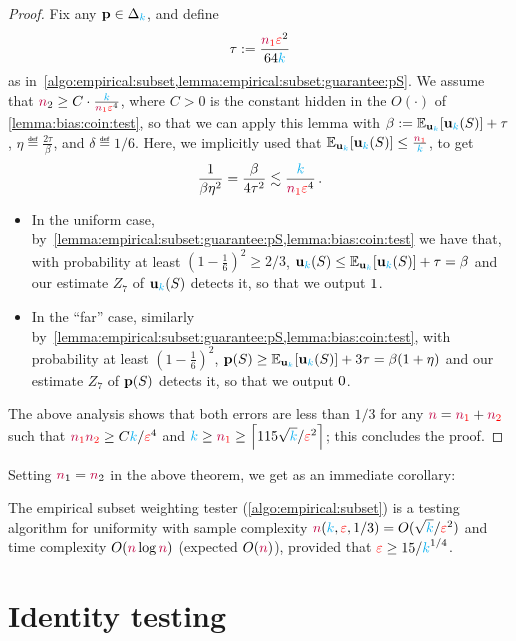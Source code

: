 \begin{proof}
Fix any $\mathbf{p}\in\Delta_{{\textcolor{cyan}{k}}}$, and define 
\[
    \tau := \frac{\textcolor{red}{{\textcolor{purple}{n}}_1}\textcolor{red}{\varepsilon}^2}{64{\textcolor{cyan}{k}}}
\]
as in~\cref{algo:empirical:subset,lemma:empirical:subset:guarantee:pS}. We assume that ${\textcolor{purple}{n}}_2 \geq C\cdot\frac{{\textcolor{cyan}{k}}}{\textcolor{red}{{\textcolor{purple}{n}}_1}\textcolor{red}{\varepsilon}^4}$, where $C>0$ is the constant hidden in the $O(\cdot)$ of \cref{lemma:bias:coin:test}, so that we can apply this lemma with $\beta \eqdef \bE{\uniform_\ab}{\uniform_\ab(S)} + \tau$, $\eta\eqdef \frac{2\tau}{\beta}$, and $\delta \eqdef 1/6$. Here, we implicitly used that
$
 \bE{\uniform_\ab}{\uniform_\ab(S)} \leq \frac{\nss}{\ab}
$,
to get
\[
    \frac{1}{\beta\eta^2} = \frac{\beta}{4\tau^2} \lesssim \frac{{\textcolor{cyan}{k}}}{\textcolor{red}{{\textcolor{purple}{n}}_1}\textcolor{red}{\varepsilon}^4}\,.
\]
\begin{itemize}
    \item In the uniform case, by~\cref{lemma:empirical:subset:guarantee:pS,lemma:bias:coin:test} we have that, with probability at least $(1-\frac{1}{6})^2 \geq 2/3$,
    $\uniform_\ab(S) \leq \bE{\uniform_\ab}{\uniform_\ab(S)} + \tau = \beta$ and our estimate $Z_7$ of  $\mathbf{u}_{\textcolor{cyan}{k}}(S)$ detects it, so that we output $1$. 
    \item In the ``far'' case, similarly by~\cref{lemma:empirical:subset:guarantee:pS,lemma:bias:coin:test}, with probability at least $(1-\frac{1}{6})^2$,
    $\p(S) \geq \bE{\uniform_\ab}{\uniform_\ab(S)} + 3\tau = \beta(1+\eta)$ and our estimate $Z_7$ of  $\mathbf{p}(S)$ detects it, so that we output $0$. 
\end{itemize}
  The above analysis shows that both errors are less than $1/3$ for any ${\textcolor{purple}{n}} = \textcolor{red}{{\textcolor{purple}{n}}_1}+\textcolor{red}{{\textcolor{purple}{n}}_2}$ such that $\textcolor{red}{{\textcolor{purple}{n}}_1}\textcolor{red}{{\textcolor{purple}{n}}_2} \geq C{\textcolor{cyan}{k}}/\textcolor{red}{\varepsilon}^4$ and $\ab\geq\nss \geq \clg{115\sqrt{\ab}/\dst^2}$; this concludes the proof.
\end{proof}
Setting ${\textcolor{purple}{n}}_1={\textcolor{purple}{n}}_2$ in the above theorem, we get as an immediate corollary:
\begin{corollary}
  \label{coro:empirical-subset}
The empirical subset weighting tester (\cref{algo:empirical:subset}) is a testing algorithm for uniformity with sample complexity ${\textcolor{purple}{n}}({\textcolor{cyan}{k}},\textcolor{red}{\varepsilon},1/3) = O(\sqrt{{\textcolor{cyan}{k}}}/\textcolor{red}{\varepsilon}^2)$ and time complexity $O({\textcolor{purple}{n}}\log{\textcolor{purple}{n}})$ (expected $O({\textcolor{purple}{n}})$), provided that $\textcolor{red}{\varepsilon} \geq 15/{\textcolor{cyan}{k}}^{1/4}$.
\end{corollary}

\section{Identity testing}
  \label{sec:identity}

